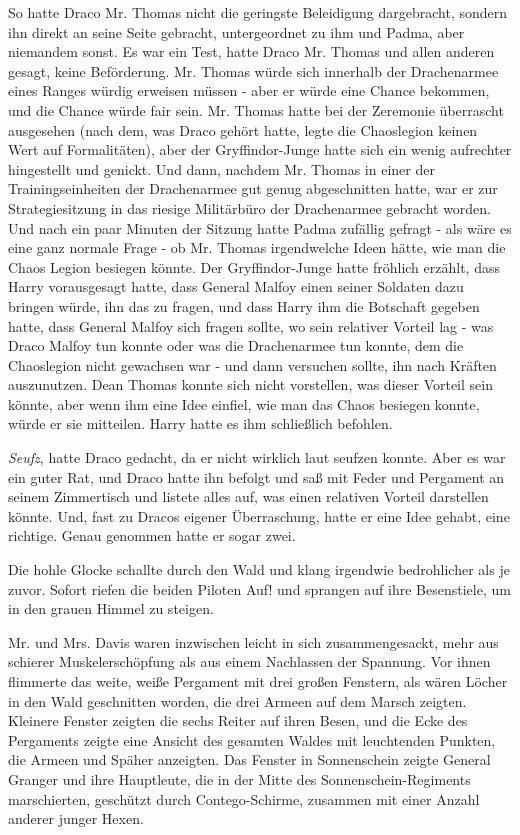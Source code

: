 So hatte Draco Mr. Thomas nicht die geringste Beleidigung dargebracht, sondern
ihn direkt an seine Seite gebracht, untergeordnet zu ihm und Padma, aber
niemandem sonst. Es war ein Test, hatte Draco Mr. Thomas und allen anderen
gesagt, keine Beförderung. Mr. Thomas würde sich innerhalb der Drachenarmee
eines Ranges würdig erweisen müssen - aber er würde eine Chance bekommen, und
die Chance würde fair sein. Mr. Thomas hatte bei der Zeremonie überrascht
ausgesehen (nach dem, was Draco gehört hatte, legte die Chaoslegion keinen Wert
auf Formalitäten), aber der Gryffindor-Junge hatte sich ein wenig aufrechter
hingestellt und genickt. Und dann, nachdem Mr. Thomas in einer der
Trainingseinheiten der Drachenarmee gut genug abgeschnitten hatte, war er zur
Strategiesitzung in das riesige Militärbüro der Drachenarmee gebracht worden.
Und nach ein paar Minuten der Sitzung hatte Padma zufällig gefragt - als wäre es
eine ganz normale Frage - ob Mr. Thomas irgendwelche Ideen hätte, wie man die
Chaos Legion besiegen könnte. Der Gryffindor-Junge hatte fröhlich erzählt, dass
Harry vorausgesagt hatte, dass General Malfoy einen seiner Soldaten dazu bringen
würde, ihn das zu fragen, und dass Harry ihm die Botschaft gegeben hatte, dass
General Malfoy sich fragen sollte, wo sein relativer Vorteil lag - was Draco
Malfoy tun konnte oder was die Drachenarmee tun konnte, dem die Chaoslegion
nicht gewachsen war - und dann versuchen sollte, ihn nach Kräften auszunutzen.
Dean Thomas konnte sich nicht vorstellen, was dieser Vorteil sein könnte, aber
wenn ihm eine Idee einfiel, wie man das Chaos besiegen konnte, würde er sie
mitteilen. Harry hatte es ihm schließlich befohlen.

\emph{Seufz}, hatte Draco gedacht, da er nicht wirklich laut seufzen konnte.
Aber es war ein guter Rat, und Draco hatte ihn befolgt und saß mit Feder und
Pergament an seinem Zimmertisch und listete alles auf, was einen relativen
Vorteil darstellen könnte. Und, fast zu Dracos eigener Überraschung, hatte er
eine Idee gehabt, eine richtige. Genau genommen hatte er sogar zwei.

Die hohle Glocke schallte durch den Wald und klang irgendwie bedrohlicher als je
zuvor. Sofort riefen die beiden Piloten \glqq{}Auf!\grqq{} und sprangen auf ihre
Besenstiele, um in den grauen Himmel zu steigen.

Mr. und Mrs. Davis waren inzwischen leicht in sich zusammengesackt, mehr aus
schierer Muskelerschöpfung als aus einem Nachlassen der Spannung. Vor ihnen
flimmerte das weite, weiße Pergament mit drei großen Fenstern, als wären Löcher
in den Wald geschnitten worden, die drei Armeen auf dem Marsch zeigten. Kleinere
Fenster zeigten die sechs Reiter auf ihren Besen, und die Ecke des Pergaments
zeigte eine Ansicht des gesamten Waldes mit leuchtenden Punkten, die Armeen und
Späher anzeigten. Das Fenster in Sonnenschein zeigte General Granger und ihre
Hauptleute, die in der Mitte des Sonnenschein-Regiments marschierten, geschützt
durch Contego-Schirme, zusammen mit einer Anzahl anderer junger Hexen.

